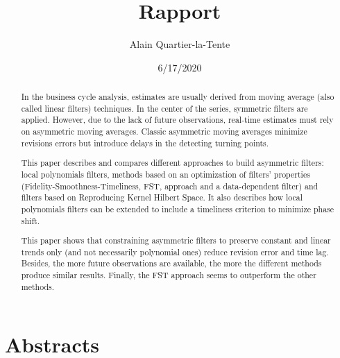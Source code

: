 \documentclass[
  12pt,
  ,
  a4paper]{article}
\title{Rapport}
\author{Alain Quartier-la-Tente}
\date{6/17/2020}
\newcommand\1{\mathds{1}}
\begin{document}
\maketitle

{
\hypersetup{linkcolor=}
\setcounter{tocdepth}{3}
\tableofcontents
}
\newpage

\hypertarget{abstracts}{%
\section*{Abstracts}\label{abstracts}}

\begin{abstract}
In the business cycle analysis, estimates are usually derived from moving average (also called linear filters) techniques. 
In the center of the series, symmetric filters are applied. 
However, due to the lack of future observations, real-time estimates must rely on asymmetric moving averages.
Classic asymmetric moving averages minimize revisions errors but introduce delays in the detecting turning points.

This paper describes and compares different approaches to build asymmetric filters: local polynomials filters, methods based on an optimization of filters' properties (Fidelity-Smoothness-Timeliness, FST, approach and a data-dependent filter) and filters based on Reproducing Kernel Hilbert Space.
It also describes how local polynomials filters can be extended to include a timeliness criterion to minimize phase shift.

This paper shows that constraining asymmetric filters to preserve constant and linear trends only (and not necessarily polynomial ones) reduce revision error and time lag. 
Besides, the more future observations are available, the more the different methods produce similar results.
Finally, the FST approach seems to outperform the other methods.
\end{abstract}

\renewcommand{\abstractname}{Résumé}
\end{document}
